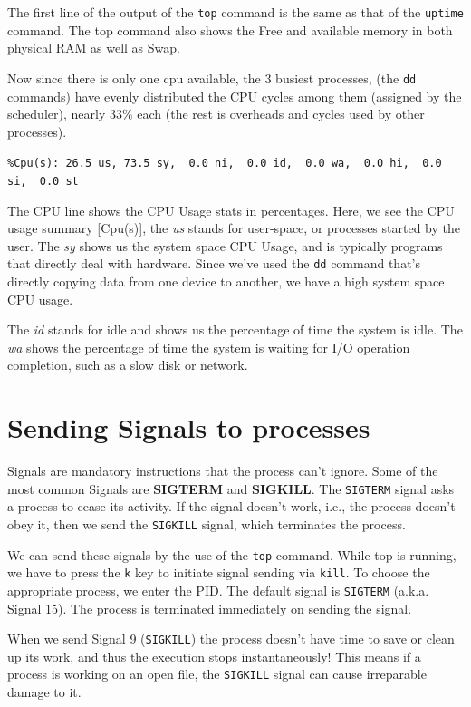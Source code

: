 \noindent
The first line of the output of the \verb|top| command is the same as that of the \verb|uptime| command. The top command also shows the Free and available memory in both physical RAM as well as Swap. 

Now since there is only one cpu available, the 3 busiest processes, (the \verb|dd| commands) have evenly distributed the CPU cycles among them (assigned by the scheduler), nearly 33\% each (the rest is overheads and cycles used by other processes).

\noindent
\verb|%Cpu(s): 26.5 us, 73.5 sy,  0.0 ni,  0.0 id,  0.0 wa,  0.0 hi,  0.0 si,  0.0 st| 

The CPU line shows the CPU Usage stats in percentages. Here, we see the CPU usage summary [Cpu(s)], the \textit{us} stands for user-space, or processes started by the user. The \textit{sy}  shows us the system space CPU Usage, and is typically programs that directly deal with hardware. Since we've used the \verb|dd| command that's directly copying data from one device to another, we have a high system space CPU usage. 

The \textit{id} stands for idle and shows us the percentage of time the system is idle. The \textit{wa} shows the percentage of time the system is waiting for I/O operation completion, such as a slow disk or network. 

	\section{Sending Signals to processes}
Signals are mandatory instructions that the process can't ignore. Some of the most common Signals are \textbf{SIGTERM} and \textbf{SIGKILL}. The \verb|SIGTERM| signal asks a process to cease its activity. If the signal doesn't work, i.e., the process doesn't obey it, then we send the \verb|SIGKILL| signal, which terminates the process. 

We can send these signals by the use of the \verb|top| command. While top is running, we have to press the \verb|k| key to initiate signal sending via \verb|kill|. To choose the appropriate process, we enter the PID. The default signal is \verb|SIGTERM| (a.k.a. Signal 15). The process is terminated immediately on sending the signal. 

When we send Signal 9 (\verb|SIGKILL|) the process doesn't have time to save or clean up its work, and thus the execution stops instantaneously! This means if a process is working on an open file, the \verb|SIGKILL| signal can cause irreparable damage to it. 

